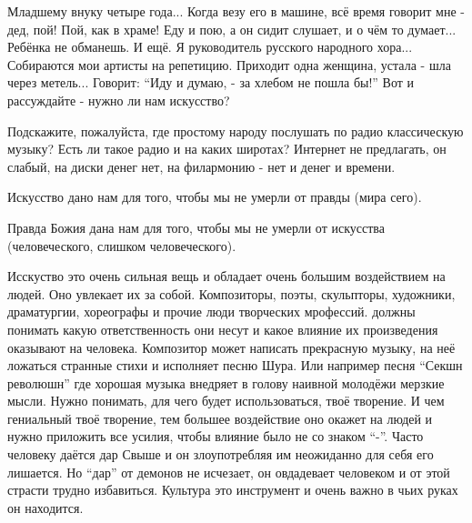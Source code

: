 \begin{itemize}

Младшему внуку четыре года... Когда везу его в машине, всё время говорит мне -
дед, пой! Пой, как в храме! Еду и пою, а он сидит слушает, и о чём то думает...
Ребёнка не обманешь. И ещё. Я руководитель русского народного хора...
Собираются мои артисты на репетицию. Приходит одна женщина, устала - шла через
метель... Говорит: \enquote{Иду и думаю, - за хлебом не пошла бы!} Вот и рассуждайте -
нужно ли нам искусство?


Подскажите, пожалуйста, где простому народу послушать по радио классическую
музыку? Есть ли такое радио и на каких широтах? Интернет не предлагать, он
слабый, на диски денег нет, на филармонию - нет и денег и времени.


Искусство дано нам для того, чтобы мы не умерли от правды (мира сего).

Правда Божия дана нам для того, чтобы мы не умерли от искусства (человеческого,
слишком человеческого).


Исскуство это очень сильная вещь и обладает очень большим воздействием на
людей. Оно увлекает их за собой. Композиторы, поэты, скульпторы, художники,
драматургии, хореографы и прочие люди творческих мрофессий. должны понимать
какую ответственность они несут и какое влияние их произведения оказывают на
человека. Композитор может написать прекрасную музыку, на неё ложаться странные
стихи и исполняет песню Шура. Или например песня \enquote{Секшн революшн} где хорошая
музыка внедряет в голову наивной молодёжи мерзкие мысли. Нужно понимать, для
чего будет использоваться, твоё творение. И чем гениальный твоё творение, тем
большее воздействие оно окажет на людей и нужно приложить все усилия, чтобы
влияние было не со знаком \enquote{-}. Часто человеку даётся дар Свыше и он
злоупотребляя им неожиданно для себя его лишается. Но \enquote{дар} от демонов не
исчезает, он овдадевает человеком и от этой страсти трудно избавиться. Культура
это инструмент и очень важно в чьих руках он находится.

\end{itemize} %
